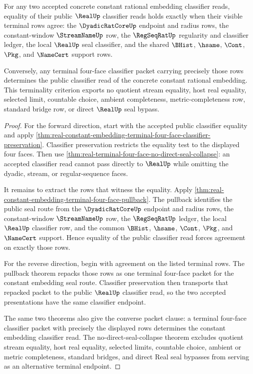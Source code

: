 \begin{theorem}
\label{thm:real-constant-embedding-four-face-classifier-terminality}
For any two accepted concrete constant rational embedding classifier reads,
equality of their public $\RealUp$ classifier reads holds exactly when their
visible terminal rows agree: the $\DyadicRatCoreUp$ endpoint and radius rows,
the constant-window $\StreamNameUp$ row, the $\RegSeqRatUp$ regularity and
classifier ledger, the local $\RealUp$ seal classifier, and the shared
$\BHist$, $\hsame$, $\Cont$, $\Pkg$, and $\NameCert$ support rows.

Conversely, any terminal four-face classifier packet carrying precisely those
rows determines the public classifier read of the concrete constant rational
embedding. This terminality criterion exports no quotient stream equality, host
real equality, selected limit, countable choice, ambient completeness,
metric-completeness row, standard bridge row, or direct $\RealUp$ seal bypass.
\end{theorem}
\begin{proof}
For the forward direction, start with the accepted public classifier equality
and apply
\autoref{thm:real-constant-embedding-terminal-four-face-classifier-preservation}.
Classifier preservation restricts the equality test to the displayed four
faces. Then use
\autoref{thm:real-terminal-four-face-no-direct-seal-collapse}: an accepted
classifier read cannot pass directly to $\RealUp$ while omitting the dyadic,
stream, or regular-sequence faces.

It remains to extract the rows that witness the equality. Apply
\autoref{thm:real-constant-embedding-terminal-four-face-pullback}. The pullback
identifies the public seal route from the $\DyadicRatCoreUp$ endpoint and
radius rows, the constant-window $\StreamNameUp$ row, the $\RegSeqRatUp$ ledger,
the local $\RealUp$ classifier row, and the common $\BHist$, $\hsame$, $\Cont$,
$\Pkg$, and $\NameCert$ support. Hence equality of the public classifier read
forces agreement on exactly those rows.

For the reverse direction, begin with agreement on the listed terminal rows.
The pullback theorem repacks those rows as one terminal four-face packet for the
constant embedding seal route. Classifier preservation then transports that
repacked packet to the public $\RealUp$ classifier read, so the two accepted
presentations have the same classifier endpoint.

The same two theorems also give the converse packet clause: a terminal
four-face classifier packet with precisely the displayed rows determines the
constant embedding classifier read. The no-direct-seal-collapse theorem excludes
quotient stream equality, host real equality, selected limits, countable choice,
ambient or metric completeness, standard bridges, and direct Real seal bypasses
from serving as an alternative terminal endpoint.
\end{proof}
